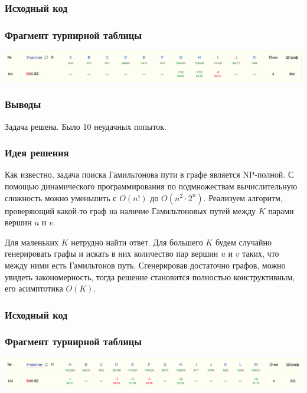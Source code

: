 \subsubsection*{Исходный код}

\subsubsection*{Фрагмент турнирной таблицы}
\includegraphics[width=\textwidth]{images/gp_dolgop.png}\newline\noindent
\subsubsection*{Выводы}
Задача решена. Было 10 неудачных попыток.
\pagebreak


\subsubsection*{Идея решения}
Как известно, задача поиска Гамильтонова пути в графе является NP-полной. С помощью динамического программирования по подмножествам вычислительную сложность можно уменьшить с $O(n!)$ до $O(n ^ 2 \cdot 2 ^ n)$. Реализуем алгоритм, проверяющий какой-то граф на наличие Гамильтоновых путей между $K$ парами вершин $u$ и $v$.

Для маленьких $K$ нетрудно найти ответ. Для большего $K$ будем случайно генерировать графы и искать в них количество пар вершин $u$ и $v$ таких, что между ними есть Гамильтонов путь. Сгенерировав достаточно графов, можно увидеть закономерность, тогда решение становится полностью конструктивным, его асимптотика $O(K)$.

\subsubsection*{Исходный код}

\subsubsection*{Фрагмент турнирной таблицы}
\includegraphics[width=\textwidth]{images/gp_imo.png}\newline\noindent
